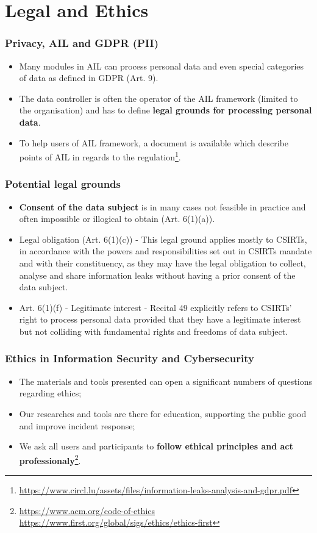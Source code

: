 \documentclass[10pt,aspectratio=169, colorlinks=true, linkcolor=circlBlue]{beamer}
\begin{document}
\section{Legal and Ethics}
\begin{frame}
        \frametitle{Privacy, AIL and GDPR (PII)}
        \begin{itemize}
                \item Many modules in AIL can process personal data and even special categories of data as defined in GDPR (Art. 9).
                \item The data controller is often the operator of the AIL framework (limited to the organisation) and has to define {\bf legal grounds for processing personal data}.
                \item To help users of AIL framework, a document is available which describe points of AIL in regards to the regulation\footnote{\url{https://www.circl.lu/assets/files/information-leaks-analysis-and-gdpr.pdf}}.
        \end{itemize}
\end{frame}

\begin{frame}
        \frametitle{Potential legal grounds}
        \begin{itemize}
                \item {\bf Consent of the data subject} is in many cases not feasible in practice and often impossible or illogical to obtain (Art. 6(1)(a)).
                \item Legal obligation (Art. 6(1)(c)) - This legal ground applies mostly to CSIRTs, in accordance with the powers and responsibilities set out in CSIRTs mandate and with their constituency, as they may have the legal obligation to collect, analyse and share information leaks without having a prior consent of the data subject.
				\item Art. 6(1)(f) - Legitimate interest - Recital 49 explicitly refers to CSIRTs’ right to process personal data provided that they have a legitimate interest but not colliding with fundamental rights and freedoms of data subject.
        \end{itemize}
\end{frame}

\begin{frame}
        \frametitle{Ethics in Information Security and Cybersecurity}
        \begin{itemize}
        \item The materials and tools presented can open a significant numbers of questions regarding ethics;
        \item Our researches and tools are there for education, supporting the public good and improve incident response;
        \item We ask all users and participants to {\bf follow ethical principles and act professionaly}\footnote{\url{https://www.acm.org/code-of-ethics} \url{https://www.first.org/global/sigs/ethics/ethics-first}}.
        \end{itemize}
\end{frame}
\end{document}
